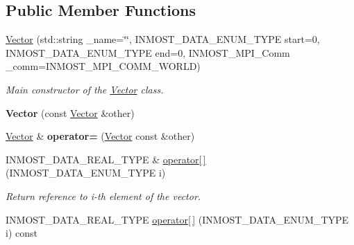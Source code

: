 \subsection*{Public Member Functions}
\begin{DoxyCompactItemize}
\item 
\hyperlink{classINMOST_1_1Solver_1_1Vector_a26af3465ba1e8abe8c3b3ed87782bffe}{Vector} (std\-::string \-\_\-name=\char`\"{}\char`\"{}, I\-N\-M\-O\-S\-T\-\_\-\-D\-A\-T\-A\-\_\-\-E\-N\-U\-M\-\_\-\-T\-Y\-P\-E start=0, I\-N\-M\-O\-S\-T\-\_\-\-D\-A\-T\-A\-\_\-\-E\-N\-U\-M\-\_\-\-T\-Y\-P\-E end=0, I\-N\-M\-O\-S\-T\-\_\-\-M\-P\-I\-\_\-\-Comm \-\_\-comm=I\-N\-M\-O\-S\-T\-\_\-\-M\-P\-I\-\_\-\-C\-O\-M\-M\-\_\-\-W\-O\-R\-L\-D)
\begin{DoxyCompactList}\small\item\em Main constructor of the \hyperlink{classINMOST_1_1Solver_1_1Vector}{Vector} class. \end{DoxyCompactList}\item 
\hypertarget{classINMOST_1_1Solver_1_1Vector_adab41112363d76af00433b13b03d7ae6}{{\bfseries Vector} (const \hyperlink{classINMOST_1_1Solver_1_1Vector}{Vector} \&other)}\label{classINMOST_1_1Solver_1_1Vector_adab41112363d76af00433b13b03d7ae6}

\item 
\hypertarget{classINMOST_1_1Solver_1_1Vector_a7e238e8da0d5a3355fc5a5f6ad9dc913}{\hyperlink{classINMOST_1_1Solver_1_1Vector}{Vector} \& {\bfseries operator=} (\hyperlink{classINMOST_1_1Solver_1_1Vector}{Vector} const \&other)}\label{classINMOST_1_1Solver_1_1Vector_a7e238e8da0d5a3355fc5a5f6ad9dc913}

\item 
\hypertarget{classINMOST_1_1Solver_1_1Vector_a72d70af6dcfbc0019c9eba3b75b67c25}{I\-N\-M\-O\-S\-T\-\_\-\-D\-A\-T\-A\-\_\-\-R\-E\-A\-L\-\_\-\-T\-Y\-P\-E \& \hyperlink{classINMOST_1_1Solver_1_1Vector_a72d70af6dcfbc0019c9eba3b75b67c25}{operator\mbox{[}$\,$\mbox{]}} (I\-N\-M\-O\-S\-T\-\_\-\-D\-A\-T\-A\-\_\-\-E\-N\-U\-M\-\_\-\-T\-Y\-P\-E i)}\label{classINMOST_1_1Solver_1_1Vector_a72d70af6dcfbc0019c9eba3b75b67c25}

\begin{DoxyCompactList}\small\item\em Return reference to i-\/th element of the vector. \end{DoxyCompactList}\item 
\hypertarget{classINMOST_1_1Solver_1_1Vector_aa0c3166f37fd25e4117546c941e0f7d6}{I\-N\-M\-O\-S\-T\-\_\-\-D\-A\-T\-A\-\_\-\-R\-E\-A\-L\-\_\-\-T\-Y\-P\-E \hyperlink{classINMOST_1_1Solver_1_1Vector_aa0c3166f37fd25e4117546c941e0f7d6}{operator\mbox{[}$\,$\mbox{]}} (I\-N\-M\-O\-S\-T\-\_\-\-D\-A\-T\-A\-\_\-\-E\-N\-U\-M\-\_\-\-T\-Y\-P\-E i) const }\label{classINMOST_1_1Solver_1_1Vector_aa0c3166f37fd25e4117546c941e0f7d6}


\end{DoxyCompactItemize}
